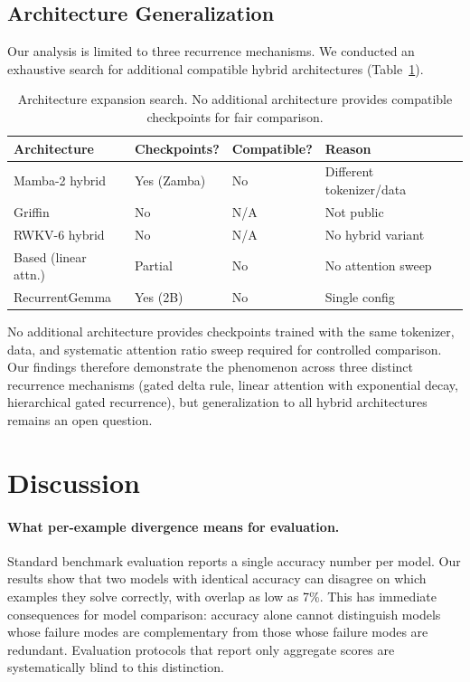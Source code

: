 \documentclass[11pt]{article}
\begin{document}
\subsection{Architecture Generalization}
\label{sec:expansion}

Our analysis is limited to three recurrence mechanisms. We conducted an exhaustive search for additional compatible hybrid architectures (Table~\ref{tab:arch_search}).

\begin{table}[t]
\centering
\caption{Architecture expansion search. No additional architecture provides compatible checkpoints for fair comparison.}
\label{tab:arch_search}
\begin{tabular}{llll}
\toprule
Architecture & Checkpoints? & Compatible? & Reason \\
\midrule
Mamba-2 hybrid & Yes (Zamba) & No & Different tokenizer/data \\
Griffin & No & N/A & Not public \\
RWKV-6 hybrid & No & N/A & No hybrid variant \\
Based (linear attn.) & Partial & No & No attention sweep \\
RecurrentGemma & Yes (2B) & No & Single config \\
\bottomrule
\end{tabular}
\end{table}

No additional architecture provides checkpoints trained with the same tokenizer, data, and systematic attention ratio sweep required for controlled comparison. Our findings therefore demonstrate the phenomenon across three distinct recurrence mechanisms (gated delta rule, linear attention with exponential decay, hierarchical gated recurrence), but generalization to all hybrid architectures remains an open question.

\section{Discussion}

\paragraph{What per-example divergence means for evaluation.}
Standard benchmark evaluation reports a single accuracy number per model. Our results show that two models with identical accuracy can disagree on which examples they solve correctly, with overlap as low as 7\%. This has immediate consequences for model comparison: accuracy alone cannot distinguish models whose failure modes are complementary from those whose failure modes are redundant. Evaluation protocols that report only aggregate scores are systematically blind to this distinction.
\end{document}
